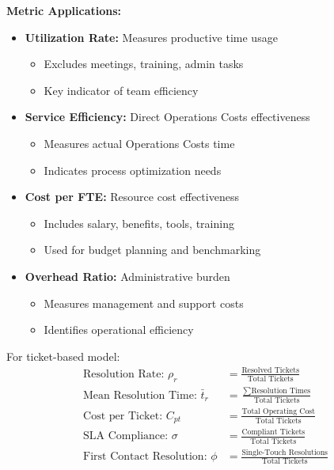 \documentclass[12pt,a4paper]{article}
\newenvironment{definition}[1]
{\begin{mdframed}[style=definitionstyle,frametitle={Definition: #1}]}
{\end{mdframed}}
\newenvironment{explanation}
{\begin{mdframed}[style=explanationstyle,frametitle={Explanation}]}
{\end{mdframed}}
\begin{document}
\begin{explanation}
\textbf{Metric Applications:}
\begin{itemize}
    \item \textbf{Utilization Rate:} Measures productive time usage
        \begin{itemize}
            \item Excludes meetings, training, admin tasks
            \item Key indicator of team efficiency
        \end{itemize}
    \item \textbf{Service Efficiency:} Direct Operations Costs effectiveness
        \begin{itemize}
            \item Measures actual Operations Costs time
            \item Indicates process optimization needs
        \end{itemize}
    \item \textbf{Cost per FTE:} Resource cost effectiveness
        \begin{itemize}
            \item Includes salary, benefits, tools, training
            \item Used for budget planning and benchmarking
        \end{itemize}
    \item \textbf{Overhead Ratio:} Administrative burden
        \begin{itemize}
            \item Measures management and support costs
            \item Identifies operational efficiency
        \end{itemize}
\end{itemize}
\end{explanation}

\begin{definition}{Ticket Performance Metrics}
For ticket-based model:
\begin{align*}
    \text{Resolution Rate: } \rho_r &= \frac{\text{Resolved Tickets}}{\text{Total Tickets}} \\[1em]
    \text{Mean Resolution Time: } \bar{t}_r &= \frac{\sum \text{Resolution Times}}{\text{Total Tickets}} \\[1em]
    \text{Cost per Ticket: } C_{pt} &= \frac{\text{Total Operating Cost}}{\text{Total Tickets}} \\[1em]
    \text{SLA Compliance: } \sigma &= \frac{\text{Compliant Tickets}}{\text{Total Tickets}} \\[1em]
    \text{First Contact Resolution: } \phi &= \frac{\text{Single-Touch Resolutions}}{\text{Total Tickets}}
\end{align*}
\end{definition}
\end{document}
